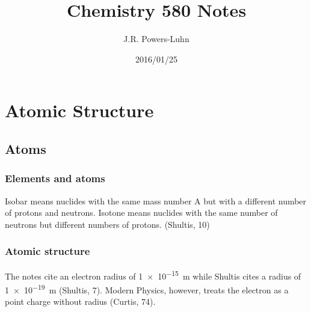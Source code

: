 \documentclass{article}
\author{J.R. Powers-Luhn}
\date{2016/01/25}
\title{Chemistry 580 Notes}
\begin{document}
\section{Atomic Structure}

\subsection{Atoms}

\subsubsection{Elements and atoms}
Isobar means nuclides with the same mass number A but with a different number of protons and neutrons. Isotone means nuclides with the same number of neutrons but different numbers of protons. (Shultis, 10)

\subsubsection{Atomic structure}
The notes cite an electron radius of \SI{1e-15}{\meter} while Shultis cites a radius of \SI{1e-19}{\meter} (Shultis, 7). Modern Physics, however, treats the electron as a point charge without radius (Curtis, 74).
\end{document}
